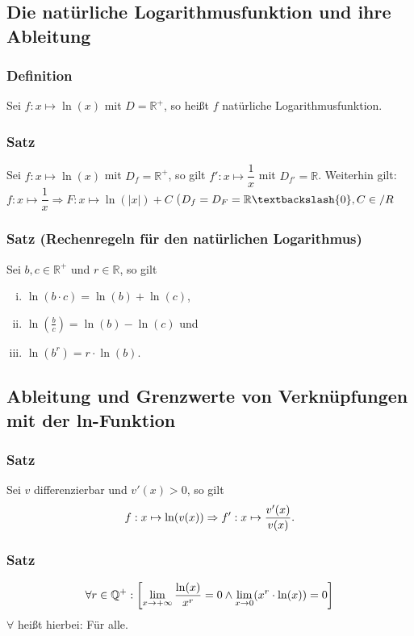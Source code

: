 \documentclass[a4paper,12pt]{article}
\newcommand{\Q}{\mathbb{Q}}
\newcommand{\R}{\mathbb{R}}
\begin{document}
\subsection{Die natürliche Logarithmusfunktion und ihre Ableitung}
\subsubsection{Definition}
Sei $f:x\mapsto \ln(x)$ mit $D=\R^+$, so heißt $f$ natürliche Logarithmusfunktion.

\subsubsection{Satz}
Sei $f:x\mapsto \ln(x)$ mit $D_f=\R^+$, so gilt $f':x\mapsto \dfrac{1}{x}$ mit $D_{f'}=\R$.
Weiterhin gilt: $f:x\mapsto \dfrac{1}{x} \Rightarrow F:x\mapsto \ln(|x|)+C$ ($D_f=D_F=\R \textbackslash \{ 0 \}, C\in/R$

\subsubsection{Satz (Rechenregeln für den natürlichen Logarithmus)}
Sei $b,c\in\R^+$ und $r\in\R$, so gilt
\begin{enumerate}[(i)]
\item $\ln(b\cdot c) = \ln(b) + \ln(c)$,
\item $\ln(\frac{b}{c})=\ln(b)-\ln(c)$ und
\item $\ln(b^r)=r\cdot \ln(b)$.
\end{enumerate}

\subsection{Ableitung und Grenzwerte von Verknüpfungen mit der ln-Funktion}
\subsubsection{Satz}
Sei $v$ differenzierbar und $v'(x)>0$, so gilt
\[ f:x \mapsto \ln \mleft( v(x) \mright) \Rightarrow f':x\mapsto \dfrac{v'(x)}{v(x)} \text{.}\]


\subsubsection{Satz}
\[ \forall r\in \Q^+: \mleft[ \lim\limits_{x\rightarrow +\infty} \dfrac{\ln(x)}{x^r}=0 \land \lim\limits_{x\rightarrow 0}\mleft(x^r\cdot \ln(x) \mright)=0 \mright] \]
$\forall$ heißt hierbei: \glqq Für alle\grqq.
\end{document}
